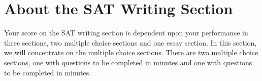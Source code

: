 \section{About the SAT Writing Section}

Your score on the SAT writing section is dependent upon your performance in three sections, two multiple choice sections and one essay section. In this section, we will concentrate on the multiple choice sections. There are two multiple choice sections, one with \underline{\hspace{2in}} questions to be completed in \underline{\hspace{2in}} minutes and one with \underline{\hspace{2in}} questions to be completed in \underline{\hspace{2in}} minutes.